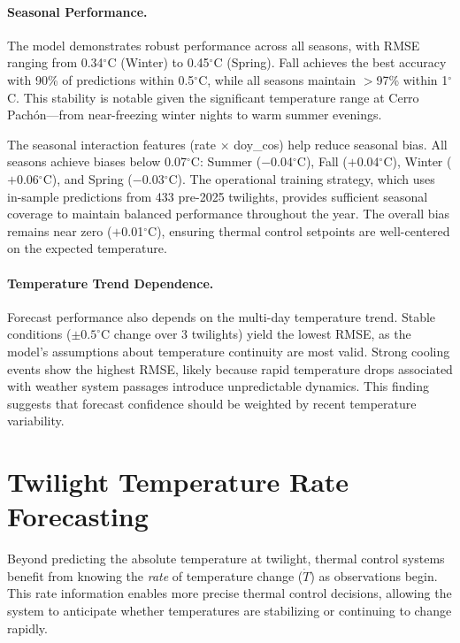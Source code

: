 \documentclass[twocolumn]{aastex631}
\begin{document}
\paragraph{Seasonal Performance.}
The model demonstrates robust performance across all seasons, with RMSE ranging from 0.34$^\circ$C (Winter) to 0.45$^\circ$C (Spring). Fall achieves the best accuracy with 90\% of predictions within 0.5$^\circ$C, while all seasons maintain $>$97\% within 1$^\circ$C. This stability is notable given the significant temperature range at Cerro Pach\'on---from near-freezing winter nights to warm summer evenings.

The seasonal interaction features (rate $\times$ doy\_cos) help reduce seasonal bias. All seasons achieve biases below 0.07$^\circ$C: Summer ($-$0.04$^\circ$C), Fall ($+$0.04$^\circ$C), Winter ($+$0.06$^\circ$C), and Spring ($-$0.03$^\circ$C). The operational training strategy, which uses in-sample predictions from 433 pre-2025 twilights, provides sufficient seasonal coverage to maintain balanced performance throughout the year. The overall bias remains near zero ($+$0.01$^\circ$C), ensuring thermal control setpoints are well-centered on the expected temperature.

\paragraph{Temperature Trend Dependence.}
Forecast performance also depends on the multi-day temperature trend. Stable conditions ($\pm 0.5^\circ$C change over 3 twilights) yield the lowest RMSE, as the model's assumptions about temperature continuity are most valid. Strong cooling events show the highest RMSE, likely because rapid temperature drops associated with weather system passages introduce unpredictable dynamics. This finding suggests that forecast confidence should be weighted by recent temperature variability.

\section{Twilight Temperature Rate Forecasting}
\label{sec:rate}

Beyond predicting the absolute temperature at twilight, thermal control systems benefit from knowing the \emph{rate} of temperature change ($\dot{T}$) as observations begin. This rate information enables more precise thermal control decisions, allowing the system to anticipate whether temperatures are stabilizing or continuing to change rapidly.
\end{document}
